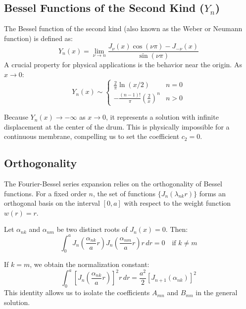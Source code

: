 \documentclass[11pt, letterpaper]{article}
\begin{document}
\subsection{Bessel Functions of the Second Kind ($Y_n$)}
The Bessel function of the second kind (also known as the Weber or Neumann function) is defined as:
\begin{equation}
    Y_n(x) = \lim_{\nu \to n} \frac{J_\nu(x) \cos(\nu \pi) - J_{-\nu}(x)}{\sin(\nu \pi)}
\end{equation}
A crucial property for physical applications is the behavior near the origin. As $x \to 0$:
\begin{equation}
    Y_n(x) \sim \begin{cases} 
    \frac{2}{\pi} \ln(x/2) & n=0 \\ 
    -\frac{(n-1)!}{\pi} \left(\frac{2}{x}\right)^n & n > 0 
    \end{cases}
\end{equation}


Because $Y_n(x) \to -\infty$ as $x \to 0$, it represents a solution with infinite displacement at the center of the drum. This is physically impossible for a continuous membrane, compelling us to set the coefficient $c_2 = 0$.

\subsection{Orthogonality}
The Fourier-Bessel series expansion relies on the orthogonality of Bessel functions. For a fixed order $n$, the set of functions $\{J_n(\lambda_{nk} r)\}$ forms an orthogonal basis on the interval $[0, a]$ with respect to the weight function $w(r) = r$.

Let $\alpha_{nk}$ and $\alpha_{nm}$ be two distinct roots of $J_n(x) = 0$. Then:
\begin{equation}
    \int_0^a J_n\left(\frac{\alpha_{nk}}{a} r\right) J_n\left(\frac{\alpha_{nm}}{a} r\right) r \, dr = 0 \quad \text{if } k \neq m
\end{equation}

If $k = m$, we obtain the normalization constant:
\begin{equation}
    \int_0^a \left[ J_n\left(\frac{\alpha_{nk}}{a} r\right) \right]^2 r \, dr = \frac{a^2}{2} [J_{n+1}(\alpha_{nk})]^2
\end{equation}
This identity allows us to isolate the coefficients $A_{mn}$ and $B_{mn}$ in the general solution.
\end{document}
